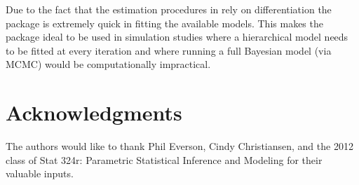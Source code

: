 \documentclass[article]{jss}
\begin{document}
Due to the fact that the estimation procedures in  rely on differentiation the package is extremely quick in fitting the available models. This makes the package ideal to be used in simulation studies where a hierarchical model needs to be fitted at every iteration and where running a full Bayesian model (via MCMC) would be computationally impractical.

\section[acknowledgments]{Acknowledgments}
The authors would like to thank Phil Everson, Cindy Christiansen, and the 2012 class of Stat 324r: Parametric Statistical Inference and Modeling for their valuable inputs.


\end{document}
